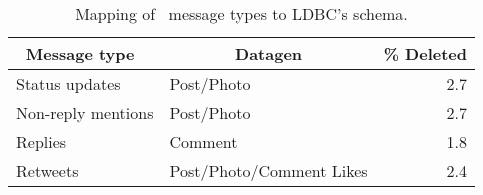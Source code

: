 \begin{table}[H]
  \centering
  \begin{tabular}{ |l|l|r| }
    \hline
    \multicolumn{1}{|c|}{\textbf{Message type~\cite{DBLP:conf/cscw/AlmuhimediWLSA13}}} &
    \multicolumn{1}{c|}{\textbf{Datagen}} &
    \multicolumn{1}{c|}{\textbf{\% Deleted}} \\
    \hline\hline
    Status updates & Post/Photo & 2.7 \\
    \hline
    Non-reply mentions &  Post/Photo & 2.7 \\
    \hline
    Replies & Comment & 1.8 \\
    \hline
    Retweets & Post/Photo/Comment Likes & 2.4 \\
    \hline
  \end{tabular}
  \centering
  \caption{Mapping of~\cite{DBLP:conf/cscw/AlmuhimediWLSA13} message types to LDBC's schema.}
  \label{table:almuhimedi-mapping}
\end{table}
